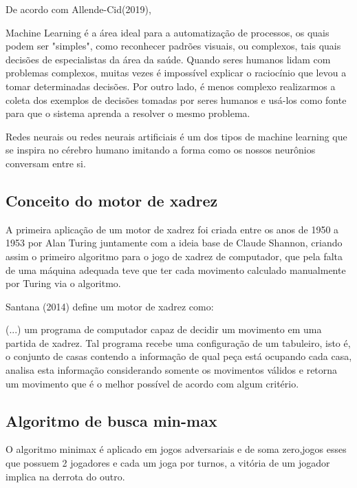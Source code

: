 De acordo com Allende-Cid(2019),
\begin{citacao}
    Machine Learning é a área ideal para a automatização de processos, os quais podem ser "simples", como reconhecer padrões visuais, ou complexos,
    tais quais decisões de especialistas da área da saúde. Quando seres humanos lidam com problemas complexos, muitas vezes é impossível explicar o raciocínio
    que levou a tomar determinadas decisões. Por outro lado, é menos complexo realizarmos a coleta dos exemplos de decisões tomadas por seres humanos e usá-los
    como fonte para que o sistema aprenda a resolver o mesmo problema.\cite[tradução dos editores, p.16.]{ALLEND-CID}

\end{citacao}

Redes neurais ou redes neurais artificiais é um dos tipos de machine learning que se inspira no cérebro humano imitando a forma como
os nossos neurônios conversam entre si.

\subsection{Conceito do motor de xadrez}
A primeira aplicação de um motor de xadrez foi criada entre os anos de 1950 a 1953 por Alan Turing juntamente com a ideia base
de Claude Shannon, criando assim o primeiro algoritmo para o jogo de xadrez de computador, que pela falta de uma máquina
adequada teve que ter cada movimento calculado manualmente por Turing via o algoritmo.

Santana (2014) define um motor de xadrez como:
\begin{citacao}
    (...) um programa de computador capaz de decidir um movimento em uma partida de xadrez. Tal programa recebe uma
    configuração de um tabuleiro, isto é, o conjunto de casas contendo a informação de qual peça está ocupando cada casa,
    analisa esta informação considerando somente os movimentos válidos e retorna um movimento que é o melhor possível de
    acordo com algum critério.\cite[p.4.]{SANTANA2014}

\end{citacao}


\subsection{Algoritmo de busca min-max}
O algoritmo minimax é aplicado em jogos adversariais e de soma zero,jogos esses que possuem 2 jogadores e cada um joga
por turnos, a vitória de um jogador implica na derrota do outro.

